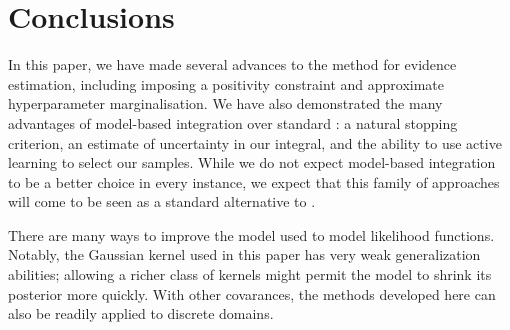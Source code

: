 \documentclass{article}
\begin{document}
\section{Conclusions}

 In this paper, we have made several advances to the  method for evidence estimation, including imposing a positivity constraint and approximate hyperparameter marginalisation.  We have also demonstrated the many advantages of model-based integration over standard : a natural stopping criterion, an estimate of uncertainty in our integral, and the ability to use active learning to select our samples. 
While we do not expect model-based integration to be a better choice in every instance, we expect that this family of approaches will come to be seen as a standard alternative to .



There are many ways to improve the \gpb model used to model likelihood functions.  Notably, the Gaussian kernel used in this paper has very weak generalization abilities;  allowing a richer class of kernels might permit the \gpb model to shrink its posterior more quickly. With other covarances, the methods developed here can also be readily applied to discrete domains.










%
%
\end{document}
